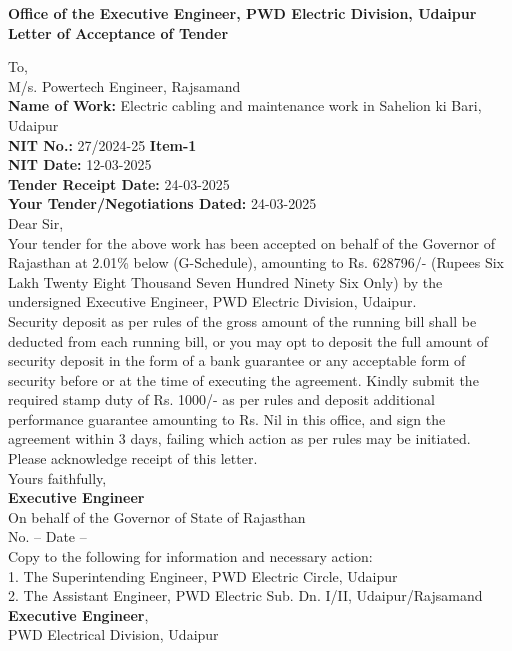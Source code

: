 \documentclass[a4paper]{article}
\begin{document}
\begin{center}
    \textbf{\Large Office of the Executive Engineer, PWD Electric Division, Udaipur} \\
    \vspace{0.5cm}
    \textbf{Letter of Acceptance of Tender}
\end{center}

To, \\
M/s. Powertech Engineer, Rajsamand \\

\vspace{0.5cm}
\textbf{Name of Work:} Electric cabling and maintenance work in Sahelion ki Bari, Udaipur \\
\textbf{NIT No.:} 27/2024-25 \quad \textbf{Item-1} \\
\textbf{NIT Date:} 12-03-2025 \\
\textbf{Tender Receipt Date:} 24-03-2025 \\
\textbf{Your Tender/Negotiations Dated:} 24-03-2025 \\

Dear Sir, \\

Your tender for the above work has been accepted on behalf of the Governor of Rajasthan at 2.01\% below (G-Schedule), amounting to Rs. 628796/- (Rupees Six Lakh Twenty Eight Thousand Seven Hundred Ninety Six Only) by the undersigned Executive Engineer, PWD Electric Division, Udaipur. \\

Security deposit as per rules of the gross amount of the running bill shall be deducted from each running bill, or you may opt to deposit the full amount of security deposit in the form of a bank guarantee or any acceptable form of security before or at the time of executing the agreement. Kindly submit the required stamp duty of Rs. 1000/- as per rules and deposit additional performance guarantee amounting to Rs. Nil in this office, and sign the agreement within 3 days, failing which action as per rules may be initiated. \\
Please acknowledge receipt of this letter. \\

Yours faithfully, \\
\vspace{0.5cm}
\textbf{Executive Engineer} \\
On behalf of the Governor of State of Rajasthan \\

No. -- \hspace{45mm} Date -- \\
Copy to the following for information and necessary action: \\
1. The Superintending Engineer, PWD Electric Circle, Udaipur \\
2. The Assistant Engineer, PWD Electric Sub. Dn. I/II, Udaipur/Rajsamand \\

\textbf{Executive Engineer}, \\
PWD Electrical Division, Udaipur
\end{document}
